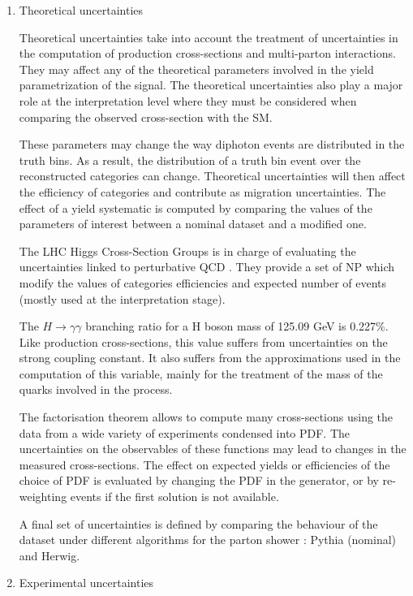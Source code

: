 \begin{enumerate}
\begin{enumerate}
\item Theoretical uncertainties
  \label{sec:orgdba6640}

Theoretical uncertainties take into account the treatment of uncertainties in the computation of production cross-sections and multi-parton interactions.
They may affect any of the theoretical parameters involved in the yield parametrization of the signal.
The theoretical uncertainties also play a major role at the interpretation level where they must be considered when comparing the observed cross-section with the SM.

These parameters may change the way diphoton events are distributed in the truth bins.
As a result, the distribution of a truth bin event over the reconstructed categories can change.
Theoretical uncertainties will then affect the efficiency of categories and contribute as migration uncertainties.
The effect of a yield systematic is computed by comparing the values of the parameters of interest between a nominal dataset and a modified one.

The LHC Higgs Cross-Section Groups is in charge of evaluating the uncertainties linked to perturbative QCD \cite{deFlorian:2227475}.
They provide a set of NP which modify the values of categories efficiencies and expected number of events (mostly used at the interpretation stage).

The $H\rightarrow \gamma\gamma$ branching ratio for a H boson mass of 125.09 GeV \cite{CERN-PH-EP-2015-075} is 0.227\%.
Like production cross-sections, this value suffers from uncertainties on the strong coupling constant.
It also suffers from the approximations used in the computation of this variable, mainly for the treatment of the mass of the quarks involved in the process.

The factorisation theorem allows to compute many cross-sections using the data from a wide variety of experiments condensed into PDF.
The uncertainties on the observables of these functions may lead to changes in the measured cross-sections.
The effect on expected yields or efficiencies of the choice of PDF is evaluated by changing the PDF in the generator, or by re-weighting events if the first solution is not available.

A final set of uncertainties is defined by comparing the behaviour of the dataset under different algorithms for the parton shower : Pythia (nominal) and Herwig.

\item Experimental uncertainties
\label{sec:org4576e4b}


\end{enumerate}
\end{enumerate}
